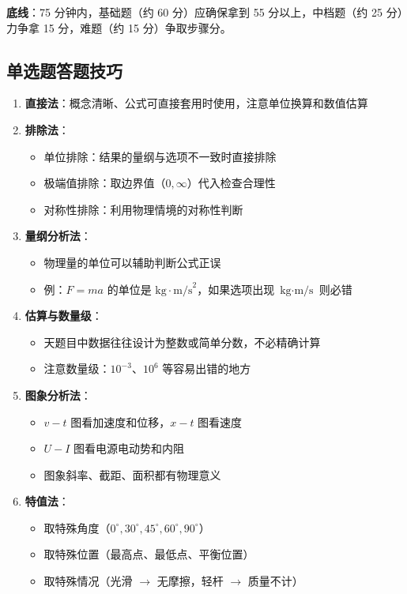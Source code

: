 \textbf{底线}：75 分钟内，基础题（约 60 分）应确保拿到 55 分以上，中档题（约 25 分）力争拿 15 分，难题（约 15 分）争取步骤分。

\subsection{单选题答题技巧}

\begin{enumerate}
  \item \textbf{直接法}：概念清晰、公式可直接套用时使用，注意单位换算和数值估算
  \item \textbf{排除法}：
    \begin{itemize}
      \item 单位排除：结果的量纲与选项不一致时直接排除
      \item 极端值排除：取边界值（$0,\infty$）代入检查合理性
      \item 对称性排除：利用物理情境的对称性判断
    \end{itemize}
  \item \textbf{量纲分析法}：
    \begin{itemize}
      \item 物理量的单位可以辅助判断公式正误
      \item 例：$F=ma$ 的单位是 $\text{kg}\cdot\text{m/s}^2$，如果选项出现 $\text{kg}\cdot\text{m/s}$ 则必错
    \end{itemize}
  \item \textbf{估算与数量级}：
    \begin{itemize}
      \item 天题目中数据往往设计为整数或简单分数，不必精确计算
      \item 注意数量级：$10^{-3}$、$10^6$ 等容易出错的地方
    \end{itemize}
  \item \textbf{图象分析法}：
    \begin{itemize}
      \item $v-t$ 图看加速度和位移，$x-t$ 图看速度
      \item $U-I$ 图看电源电动势和内阻
      \item 图象斜率、截距、面积都有物理意义
    \end{itemize}
  \item \textbf{特值法}：
    \begin{itemize}
      \item 取特殊角度（$0^\circ,30^\circ,45^\circ,60^\circ,90^\circ$）
      \item 取特殊位置（最高点、最低点、平衡位置）
      \item 取特殊情况（光滑 $\to$ 无摩擦，轻杆 $\to$ 质量不计）
    \end{itemize}
\end{enumerate}


